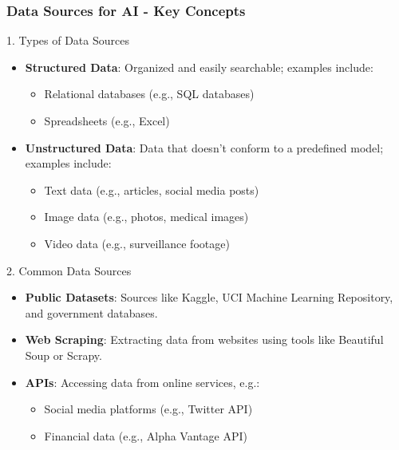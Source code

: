 \documentclass[aspectratio=169]{beamer}
\begin{document}
\begin{frame}[fragile]
    \frametitle{Data Sources for AI - Key Concepts}
    \begin{block}{1. Types of Data Sources}
        \begin{itemize}
            \item \textbf{Structured Data}: Organized and easily searchable; examples include:
            \begin{itemize}
                \item Relational databases (e.g., SQL databases)
                \item Spreadsheets (e.g., Excel)
            \end{itemize}
            \item \textbf{Unstructured Data}: Data that doesn't conform to a predefined model; examples include:
            \begin{itemize}
                \item Text data (e.g., articles, social media posts)
                \item Image data (e.g., photos, medical images)
                \item Video data (e.g., surveillance footage)
            \end{itemize}
        \end{itemize}
    \end{block}

    \begin{block}{2. Common Data Sources}
        \begin{itemize}
            \item \textbf{Public Datasets}: Sources like Kaggle, UCI Machine Learning Repository, and government databases.
            \item \textbf{Web Scraping}: Extracting data from websites using tools like Beautiful Soup or Scrapy.
            \item \textbf{APIs}: Accessing data from online services, e.g.:
            \begin{itemize}
                \item Social media platforms (e.g., Twitter API)
                \item Financial data (e.g., Alpha Vantage API)
            \end{itemize}
        \end{itemize}
    \end{block}
\end{frame}
\end{document}
